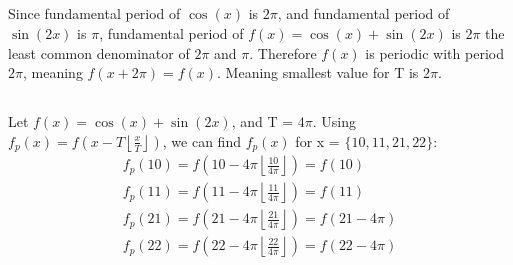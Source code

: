 \documentclass[12pt]{article}
\begin{document}
\subsection{}
Since fundamental period of $\cos(x)$ is $2\pi$, and fundamental period of $\sin(2x)$ is $\pi$, 
fundamental period of $f(x) = \cos(x)+\sin(2x)$ is $2\pi$ the least common denominator of $2\pi$ and $\pi$.
Therefore $f(x)$ is periodic with period $2\pi$, meaning $f(x+2\pi) = f(x)$. Meaning smallest value for T is $2\pi$.
\subsection{}
Let $f(x) = \cos(x)+\sin(2x)$, and T = $4\pi$. Using $f_p(x) = f(x-T\left\lfloor\frac{x}{T}\right\rfloor)$, we can find $f_p(x)$ for x = $\{10,11,21,22\}$:
\begin{equation}
    \begin{gathered}
        f_p(10) = f\left(10-4\pi\left\lfloor\frac{10}{4\pi}\right\rfloor\right) = f(10)\\
        f_p(11) = f\left(11-4\pi\left\lfloor\frac{11}{4\pi}\right\rfloor\right) = f(11)\\
        f_p(21) = f\left(21-4\pi\left\lfloor\frac{21}{4\pi}\right\rfloor\right) = f(21-4\pi)\\
        f_p(22) = f\left(22-4\pi\left\lfloor\frac{22}{4\pi}\right\rfloor\right) = f(22-4\pi)
    \end{gathered}
\end{equation}
\end{document}
